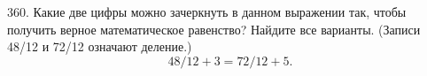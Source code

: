 360. Какие две цифры можно зачеркнуть в данном выражении так, чтобы получить верное математическое равенство? Найдите все варианты. (Записи 48/12 и 72/12 означают деление.)
$$48/12+3=72/12+5.$$
